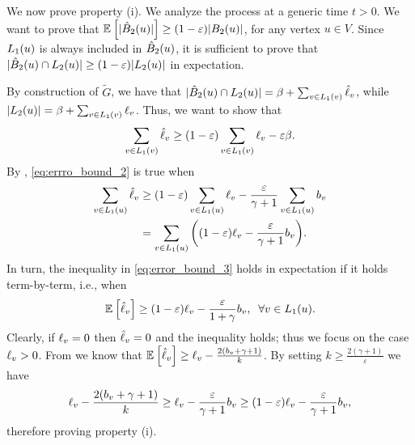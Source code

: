 We now prove property (i). 
We analyze the process at a generic time $t>0$.
We want to prove that $\mathbb{E}_{} \left[ \vert \hat{B}_2(u) \vert \right] \ge (1-\varepsilon)\vert B_2(u) \vert$, for any vertex $u \in V$. 
Since $L_1(u)$ is always included in $\hat{B}_2(u)$, it is sufficient to prove that $\vert \hat{B}_2(u) \cap L_2(u) \vert \geq (1-\varepsilon) \vert L_2(u) \vert$ in expectation.

By construction of $\widetilde{G}$, we have that $\vert \hat{B}_2(u) \cap L_2(u) \vert = \beta + \sum_{v \in L_1(v)} \hat{\ell}_v$, while $\vert L_2(u) \vert = \beta + \sum_{v \in L_1(v)} \ell_v$.
Thus, we want to show that
\begin{align} \label{eq:errro_bound_2}
    \sum_{v \in L_1(v)} \hat{\ell}_v \ge (1-\varepsilon)\sum_{v \in L_1(v)} \ell_v - \varepsilon \beta.
\end{align}
By , \eqref{eq:errro_bound_2} is true when 
\begin{equation}
\begin{aligned} \label{eq:error_bound_3}
    \sum_{v \in L_1(u)}{\hat{\ell}_v} &\ge (1-\varepsilon)\sum_{v \in L_1(u)}{\ell_v} - \frac{\varepsilon}{\gamma + 1}\sum_{v \in L_1(u)}{b_v}\\
    &= \sum_{v \in L_1(u)}{\left((1-\varepsilon)\ell_v - \frac{\varepsilon}{\gamma + 1}b_v \right)}.
\end{aligned}
\end{equation}
In turn, the inequality in \eqref{eq:error_bound_3} holds in expectation if it holds term-by-term, i.e., when
\begin{equation*}
    \mathbb{E}_{} \left[ \hat{\ell}_v \right] \ge (1-\varepsilon)\ell_v - \frac{\varepsilon}{1+\gamma}b_v, \;\; \forall v \in L_1(u).
\end{equation*}
Clearly, if $\ell_v = 0$ then $\hat{\ell}_v = 0$ and the inequality holds; thus we focus on the case $\ell_v > 0$.
From  we know that $\mathbb{E}_{} \left[ \hat{\ell}_v \right] \geq \ell_v - \frac{2(b_v + \gamma + 1)}{k}$.
By setting $k \geq \frac{2(\gamma+1)}{\varepsilon}$ we have
\begin{align*}
    \ell_v - \frac{2(b_v + \gamma + 1)}{k} \geq \ell_v - \frac{\varepsilon}{\gamma + 1} b_v \geq (1-\varepsilon)\ell_v - \frac{\varepsilon}{\gamma + 1} b_v,
\end{align*}
therefore proving property (i).


